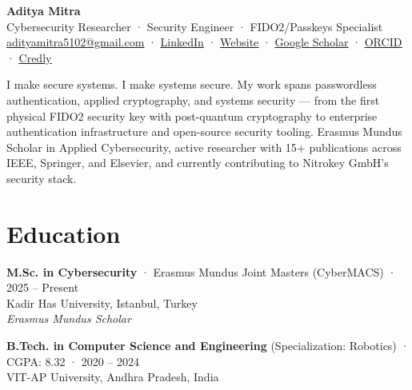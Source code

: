 \documentclass[10pt, a4paper]{article}
\begin{document}
\begin{center}
    {\LARGE\bfseries Aditya Mitra}\\[4pt]
    {\small Cybersecurity Researcher · Security Engineer · FIDO2/Passkeys Specialist}\\[4pt]
    {\small
        \href{mailto:adityamitra5102@gmail.com}{\underline{adityamitra5102@gmail.com}} ·
        \href{https://www.linkedin.com/in/AdityaMitra5102}{\underline{LinkedIn}} ·
        \href{https://adityamitra5102.github.io}{\underline{Website}} ·
        \href{https://scholar.google.com/citations?user=oXPSCNUAAAAJ}{\underline{Google Scholar}} ·
        \href{https://orcid.org/0000-0002-9612-0810}{\underline{ORCID}} ·
        \href{https://www.credly.com/users/aditya-mitra.a830b75a/badges}{\underline{Credly}}
    }
\end{center}

\vspace{4pt}

\noindent
I make secure systems. I make systems secure. My work spans passwordless authentication, applied cryptography, and systems security --- from the first physical FIDO2 security key with post-quantum cryptography to enterprise authentication infrastructure and open-source security tooling. Erasmus Mundus Scholar in Applied Cybersecurity, active researcher with 15+ publications across IEEE, Springer, and Elsevier, and currently contributing to Nitrokey GmbH's security stack.

\section*{Education}

\noindent\textbf{M.Sc. in Cybersecurity} · Erasmus Mundus Joint Masters (CyberMACS) · 2025 -- Present\\
Kadir Has University, Istanbul, Turkey\\
\textit{Erasmus Mundus Scholar}

\vspace{4pt}

\noindent\textbf{B.Tech. in Computer Science and Engineering} (Specialization: Robotics) · CGPA: 8.32 · 2020 -- 2024\\
VIT-AP University, Andhra Pradesh, India
\end{document}
